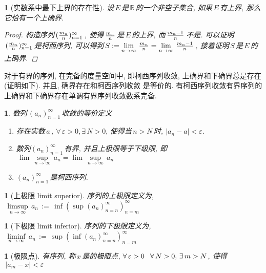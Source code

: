 \newtheorem{existence_of_superior}[theorem_root]{\theorem}
\begin{existence_of_superior}[实数系中最下上界的存在性]
设\(\,{E}\,\)是\(\,\mathbb{R}\,\)的一个非空子集合, 如果\(\,{E}\,\)有上界, 那么它恰有一个上确界.
\begin{proof}
构造序列\(\,({m_n\over n})_{n=1}^\infty\,\), 使得\(\,{m_n\over n}\,\)是\(\,{E}\,\)的上界, 而\(\,{m_n-1\over n}\,\)不是.
可以证明\(\,({m_n\over n})_{n=1}^\infty\,\)是柯西序列, 可以得到\(\,S:=\lim\limits_{n\to\infty}\,{m_n\over n}=%
\lim\limits_{n\to\infty}\,{m_n - 1\over n}\,\),
接着证明\(\,S\,\)是\(\,{E}\,\)的上确界.
\end{proof}
\end{existence_of_superior}

对于有界的序列, 在完备的度量空间中, 即柯西序列收敛, 上确界和下确界总是存在(证明如下). 并且, 确界存在和柯西序列收敛
是等价的. 有\quad 柯西序列收敛\equalwith 有界序列的上确界和下确界存在\equalwith 单调有界序列收敛\equalwith 数系完备. 

\newtheorem{sequence_convergence}[theorem_root]{}
\begin{sequence_convergence}
数列\(\,(a_n)_{n=1}^\infty\,\)收敛的等价定义
\begin{enumerate}
\item 存在实数\(\,a\,\), \(\forall\,\varepsilon>0, \exists\,N>0,\,\)使得当\(\,n>N\,\)时, \(|a_n - a|<\varepsilon\).
\item 数列\((a_n)_{n=1}^\infty\,\)有界, 并且上极限等于下级限, 即\(\,\lim\,\sup\limits_{n\to\infty}\,a_n=\lim\,\sup\limits_{n\to\infty}\,a_n\)
\item \((a_n)_{n=1}^\infty\,\)是柯西序列.
\end{enumerate}
\end{sequence_convergence}

\newtheorem{limit_superior}[theorem_root]{}
\newtheorem{limit_inferior}[theorem_root]{}
\begin{limit_superior}[上极限 limit superior]
序列\unseq 的上极限定义为, \(\,\limsup\limits_{n\to\infty}\,a_n\,:=\,\inf(\sup(a_n)_{n=n}^\infty)_{n=m}^\infty\)
\end{limit_superior}
\begin{limit_inferior}[下极限 limit inferior]
序列\unseq 的下极限定义为, \(\,\liminf\limits_{n\to\infty}\,a_n\,:=\,\sup(\inf(a_n)_{n=n}^\infty)_{n=m}^\infty\)
\end{limit_inferior}

\newtheorem{limit_point}[theorem_root]{}
\begin{limit_point}[极限点]
有序列\unseq, 称\(\,x\,\)是\unseq 的极限点, \(\forall\,\varepsilon>0\hskip.8em\relax\forall\,N>0,\,\exists\,m>N\), 使得\(\,|a_m - x|<\varepsilon\)
\end{limit_point}

